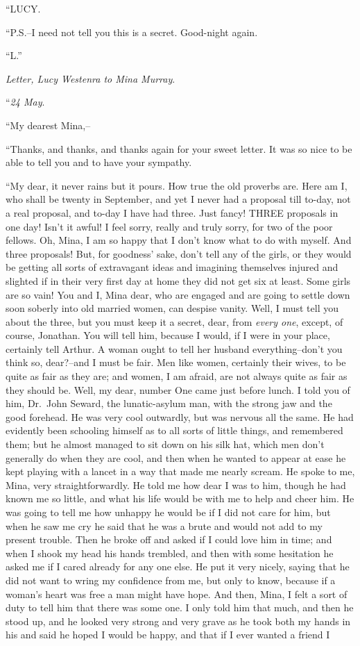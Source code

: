 \documentclass[12pt,openright]{book}
\begin{document}
“LUCY.

“P.S.–I need not tell you this is a secret. Good-night again.

“L.”

\textit{Letter, Lucy Westenra to Mina Murray}.

“\textit{24 May}.

“My dearest Mina,–

“Thanks, and thanks, and thanks again for your sweet letter. It was so nice to be able to tell you and to have your sympathy.

“My dear, it never rains but it pours. How true the old proverbs are. Here am I, who shall be twenty in September, and yet I never had a proposal till to-day, not a real proposal, and to-day I have had three. Just fancy! THREE proposals in one day! Isn’t it awful! I feel sorry, really and truly sorry, for two of the poor fellows. Oh, Mina, I am so happy that I don’t know what to do with myself. And three proposals! But, for goodness’ sake, don’t tell any of the girls, or they would be getting all sorts of extravagant ideas and imagining themselves injured and slighted if in their very first day at home they did not get six at least. Some girls are so vain! You and I, Mina dear, who are engaged and are going to settle down soon soberly into old married women, can despise vanity. Well, I must tell you about the three, but you must keep it a secret, dear, from \textit{every one}, except, of course, Jonathan. You will tell him, because I would, if I were in your place, certainly tell Arthur. A woman ought to tell her husband everything–don’t you think so, dear?–and I must be fair. Men like women, certainly their wives, to be quite as fair as they are; and women, I am afraid, are not always quite as fair as they should be. Well, my dear, number One came just before lunch. I told you of him, Dr. John Seward, the lunatic-asylum man, with the strong jaw and the good forehead. He was very cool outwardly, but was nervous all the same. He had evidently been schooling himself as to all sorts of little things, and remembered them; but he almost managed to sit down on his silk hat, which men don’t generally do when they are cool, and then when he wanted to appear at ease he kept playing with a lancet in a way that made me nearly scream. He spoke to me, Mina, very straightforwardly. He told me how dear I was to him, though he had known me so little, and what his life would be with me to help and cheer him. He was going to tell me how unhappy he would be if I did not care for him, but when he saw me cry he said that he was a brute and would not add to my present trouble. Then he broke off and asked if I could love him in time; and when I shook my head his hands trembled, and then with some hesitation he asked me if I cared already for any one else. He put it very nicely, saying that he did not want to wring my confidence from me, but only to know, because if a woman’s heart was free a man might have hope. And then, Mina, I felt a sort of duty to tell him that there was some one. I only told him that much, and then he stood up, and he looked very strong and very grave as he took both my hands in his and said he hoped I would be happy, and that if I ever wanted a friend I 
\end{document}
